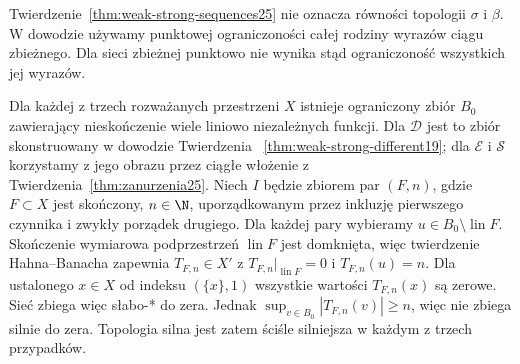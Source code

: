 \begin{uwaga}
\label{rem:sequence-net25}
Twierdzenie~\ref{thm:weak-strong-sequences25} nie oznacza
równości topologii $\sigma$ i $\beta$.
W dowodzie używamy punktowej ograniczoności całej
rodziny wyrazów ciągu zbieżnego. Dla sieci zbieżnej
punktowo nie wynika stąd ograniczoność wszystkich
jej wyrazów.

Dla każdej z trzech rozważanych przestrzeni $X$
istnieje ograniczony zbiór $B_0$ zawierający nieskończenie
wiele liniowo niezależnych funkcji. Dla $\mathcal D$
jest to zbiór skonstruowany w dowodzie Twierdzenia~
\ref{thm:weak-strong-different19}; dla $\mathcal E$
i $\mathcal S$ korzystamy z jego obrazu przez ciągłe
włożenie z Twierdzenia~\ref{thm:zanurzenia25}.
Niech $I$ będzie zbiorem par $(F,n)$, gdzie
$F\subset X$ jest skończony, $n\in\N$, uporządkowanym
przez inkluzję pierwszego czynnika i zwykły porządek
drugiego. Dla każdej pary wybieramy
$u\in B_0\setminus\operatorname{lin}F$.
Skończenie wymiarowa podprzestrzeń $\operatorname{lin}F$
jest domknięta, więc twierdzenie Hahna--Banacha
zapewnia $T_{F,n}\in X'$ z
$T_{F,n}|_{\operatorname{lin}F}=0$ i $T_{F,n}(u)=n$.
Dla ustalonego $x\in X$ od indeksu $(\{x\},1)$
wszystkie wartości $T_{F,n}(x)$ są zerowe.
Sieć zbiega więc słabo-* do zera. Jednak
$\sup_{v\in B_0}|T_{F,n}(v)|\ge n$, więc
nie zbiega silnie do zera. Topologia silna
jest zatem ściśle silniejsza w każdym z trzech przypadków.
\end{uwaga}


